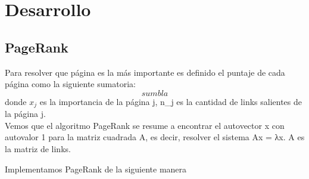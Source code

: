 \section{Desarrollo}

\subsection{PageRank}

Para resolver que página es la más importante es definido el puntaje de cada página como la siguiente sumatoria:
	$$ sum bla$$
donde $x_{j}$ es la importancia de la página j, n_{j} es la cantidad de links salientes de la página j.\\

Vemos que el algoritmo PageRank se resume a encontrar el autovector x con autovalor 1 para la matriz cuadrada A, es decir, resolver el sistema Ax = λx. A es la matriz de links.

Implementamos PageRank de la siguiente manera





